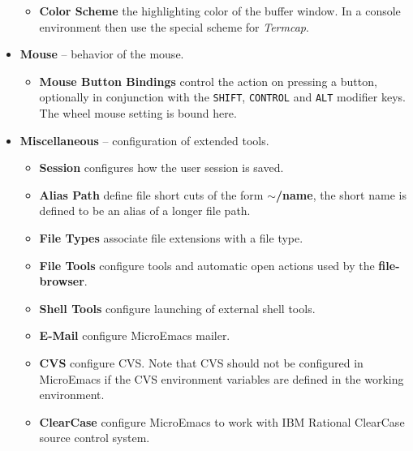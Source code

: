 \documentclass[11pt,a4paper,pdftex]{article}
\begin{document}
\begin{itemize}
\begin{itemize}
      \item \textbf{Color Scheme} the highlighting color of the buffer window.
      In a console environment then use the special scheme for
      \textit{Termcap}.

    \end{itemize}

    \item \textbf{Mouse} -- behavior of the mouse.

    \begin{itemize}

      \item \textbf{Mouse Button Bindings} control the action on pressing a
      button, optionally in conjunction with the \texttt{SHIFT},
      \texttt{CONTROL} and \texttt{ALT} modifier keys. The wheel mouse setting
      is bound here.

    \end{itemize}

    \item \textbf{Miscellaneous} -- configuration of extended tools.

    \begin{itemize}

      \item \textbf{Session} configures how the user session is saved.
      
      \item \textbf{Alias Path} define file short cuts of the form
      \textbf{$\sim$/name}, the short name is defined to be an alias of a
      longer file path. 
      
      \item \textbf{File Types} associate file extensions with a file type.
      
      \item \textbf{File Tools} configure tools and automatic open actions
      used by the \textbf{file-browser}.
      
      \item \textbf{Shell Tools} configure launching of external shell tools.
      
      \item \textbf{E-Mail} configure MicroEmacs mailer.
      
      \item \textbf{CVS} configure CVS. Note that CVS should not be configured
      in MicroEmacs if the CVS environment variables are defined in the
      working environment. 
      
      \item \textbf{ClearCase} configure MicroEmacs to work with IBM Rational
      ClearCase source control system.

    \end{itemize}
  \end{itemize}
\end{document}
